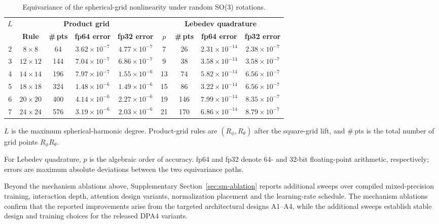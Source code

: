 \begin{table}[t]
    \PaperTableStyle
    \begin{threeparttable}
        \caption{Equivariance of the spherical-grid nonlinearity under random SO(3) rotations.}
        \label{tab:s2_full_equivariance}
        \begin{tabular*}{\linewidth}{@{\extracolsep{\fill}}ccccccccc@{}}
            \toprule
            \textbf{$L$} &
            \multicolumn{4}{c}{\textbf{Product grid}} &
            \multicolumn{4}{c}{\textbf{Lebedev quadrature}} \\
            \cmidrule(lr){2-5}\cmidrule(lr){6-9}
            & \textbf{Rule} & \textbf{\#\,pts} & \textbf{fp64 error} & \textbf{fp32 error}
            & \textbf{$p$} & \textbf{\#\,pts} & \textbf{fp64 error} & \textbf{fp32 error} \\
            \midrule
            2 & $8\times8$   & 64  & $3.62\times10^{-7}$ & $4.77\times10^{-7}$ & 7  & 26  & $2.31\times10^{-14}$ & $2.38\times10^{-7}$ \\
            3 & $12\times12$ & 144 & $7.04\times10^{-7}$ & $6.86\times10^{-7}$ & 9  & 38  & $3.58\times10^{-14}$ & $3.58\times10^{-7}$ \\
            4 & $14\times14$ & 196 & $7.97\times10^{-7}$ & $1.55\times10^{-6}$ & 13 & 74  & $5.82\times10^{-14}$ & $6.56\times10^{-7}$ \\
            5 & $18\times18$ & 324 & $1.48\times10^{-6}$ & $1.49\times10^{-6}$ & 15 & 86  & $3.22\times10^{-14}$ & $6.56\times10^{-7}$ \\
            6 & $20\times20$ & 400 & $4.14\times10^{-6}$ & $2.27\times10^{-6}$ & 19 & 146 & $7.99\times10^{-14}$ & $8.35\times10^{-7}$ \\
            7 & $24\times24$ & 576 & $3.19\times10^{-6}$ & $2.03\times10^{-6}$ & 21 & 170 & $6.86\times10^{-14}$ & $8.79\times10^{-7}$ \\
            \bottomrule
        \end{tabular*}
        \begin{tablenotes}[flushleft]
            \PaperTableNotesStyle
            \item[] $L$ is the maximum spherical-harmonic degree. Product-grid rules are $(R_{\phi},R_{\theta})$ after the square-grid lift, and \#\,pts is the total number of grid points $R_{\phi}R_{\theta}$.
            \item[] For Lebedev quadrature, $p$ is the algebraic order of accuracy. fp64 and fp32 denote 64- and 32-bit floating-point arithmetic, respectively; errors are maximum absolute deviations between the two equivariance paths.
        \end{tablenotes}
    \end{threeparttable}
\end{table}

Beyond the mechanism ablations above, Supplementary Section~\ref{sec:sm-ablation} reports additional sweeps over compiled mixed-precision training, interaction depth, attention design variants, normalization placement and the learning-rate schedule.
The mechanism ablations confirm that the reported improvements arise from the targeted architectural designs A1--A4, while the additional sweeps establish stable design and training choices for the released DPA4 variants.
